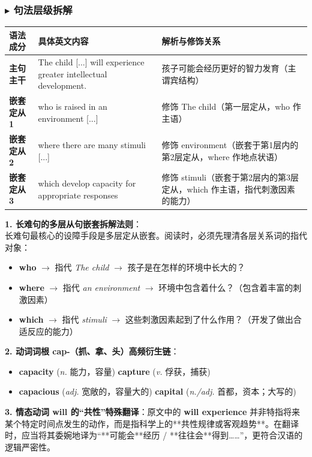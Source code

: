 \documentclass[cn,normal,11pt]{elegantnote}
\begin{document}
\subsubsection*{$\blacktriangleright$ 句法层级拆解}
\noindent
\begin{tabularx}{\textwidth}{p{3.2cm} X X}
  \toprule
  \textbf{语法成分} & \textbf{具体英文内容} & \textbf{解析与修饰关系} \\
  \midrule
  \textbf{主句主干} & The child [...] will experience greater intellectual development. & 孩子可能会经历更好的智力发育（主谓宾结构） \\
  \midrule
  \textbf{嵌套定从 1} & who is raised in an environment [...] & 修饰 The child（第一层定从，who 作主语） \\
  \midrule
  \textbf{嵌套定从 2} & where there are many stimuli [...] & 修饰 environment（嵌套于第1层内的第2层定从，where 作地点状语） \\
  \midrule
  \textbf{嵌套定从 3} & which develop capacity for appropriate responses & 修饰 stimuli（嵌套于第2层内的第3层定从，which 作主语，指代刺激因素的能力） \\
  \bottomrule
\end{tabularx}

\begin{proposition}[多层从句嵌套判定与情态动词的共性用法]
  \textbf{1. 长难句的多层从句嵌套拆解法则}：\\
  长难句最核心的设障手段是多层定从嵌套。阅读时，必须先理清各层关系词的指代对象：
  \begin{itemize}
    \item \textbf{who} $\rightarrow$ 指代 \textit{The child} $\rightarrow$ 孩子是在怎样的环境中长大的？
    \item \textbf{where} $\rightarrow$ 指代 \textit{an environment} $\rightarrow$ 环境中包含着什么？（包含着丰富的刺激因素）
    \item \textbf{which} $\rightarrow$ 指代 \textit{stimuli} $\rightarrow$ 这些刺激因素起到了什么作用？（开发了做出合适反应的能力）
  \end{itemize}
  \textbf{2. 动词词根 cap-（抓、拿、头）高频衍生链}：
  \begin{itemize}
    \item \textbf{capacity} (\textit{n.} 能力，容量) \quad \textbf{capture} (\textit{v.} 俘获，捕获)
    \item \textbf{capacious} (\textit{adj.} 宽敞的，容量大的) \quad \textbf{capital} (\textit{n./adj.} 首都，资本；大写的)
  \end{itemize}
  \textbf{3. 情态动词 will 的“共性”特殊翻译}：原文中的 \textbf{will experience} 并非特指将来某个特定时间点发生的动作，而是指科学上的**共性规律或客观趋势**。在翻译时，应当将其委婉地译为“**可能会**经历 / **往往会**得到……”，更符合汉语的逻辑严密性。
\end{proposition}
\end{document}
